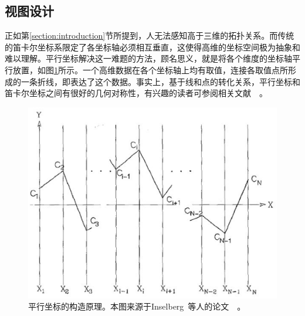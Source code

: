 \documentclass[12pt,twocolumn]{article}
\begin{document}
                                                                                                                                                                                                                                                                                                                                                                                                                                                                                                                                                                                                                                                                                                                                                                                                                                                                                                                                                                                                                                                                                                                                                                                                                                                                                              

\subsection{视图设计}
\label{subsection:designBasics}
正如第\ref{section:introduction}节所提到，人无法感知高于三维的拓扑关系。而传统的笛卡尔坐标系限定了各坐标轴必须相互垂直，这使得高维的坐标空间极为抽象和难以理解。平行坐标解决这一难题的方法，顾名思义，就是将各个维度的坐标轴平行放置，如图\ref{fig:PC_principle}所示。一个高维数据在各个坐标轴上均有取值，连接各取值点所形成的一条折线，即表达了这个数据。事实上，基于线和点的转化关系，平行坐标和笛卡尔坐标之间有很好的几何对称性，有兴趣的读者可参阅相关文献~\citep{inselberg1985plane}~\citep{inselberg2009parallel}。

\begin{figure}[!htb]
\centering
\includegraphics[width=0.9\linewidth]{images/PC_principle.eps}
\caption{\label{fig:PC_principle}平行坐标的构造原理。本图来源于Inselberg~等人的论文~\citep{inselberg1985plane}~。
}
\end{figure}
\end{document}
